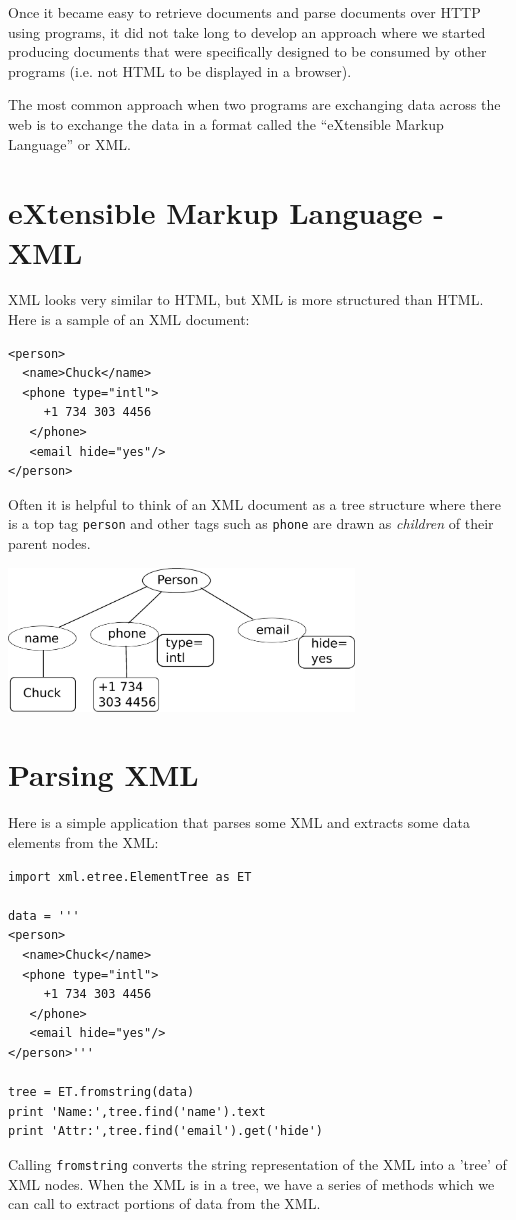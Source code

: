 \documentclass[10pt]{book}
\begin{document}
Once it became easy to retrieve documents and parse documents 
over HTTP using programs, it did not take long to develop 
an approach where we started producing documents that were specifically
designed to be consumed by other 
programs (i.e. not HTML to be displayed in a browser).

The most common approach when two programs are exchanging data across 
the web is to exchange the data in a format called the ``eXtensible Markup 
Language'' or XML.  

\section{eXtensible Markup Language - XML}

XML looks very similar to HTML, but XML is more structured 
than HTML.  Here is a sample of an XML document:

\beforeverb
\begin{verbatim}
<person>
  <name>Chuck</name>
  <phone type="intl">
     +1 734 303 4456
   </phone>
   <email hide="yes"/>
</person>
\end{verbatim}
\afterverb
%
Often it is helpful to think of an XML document as a tree structure
where there is a top tag {\tt person} and other tags such as {\tt phone}
are drawn as \emph{children} of their parent nodes.

\beforefig
\centerline{\includegraphics[height=1.50in]{figs2/xml-tree.eps}}
\afterfig

\section{Parsing XML}

Here is a simple application that parses some XML
and extracts some data elements from the XML:

\beforeverb
\begin{verbatim}
import xml.etree.ElementTree as ET

data = '''
<person>
  <name>Chuck</name>
  <phone type="intl">
     +1 734 303 4456
   </phone>
   <email hide="yes"/>
</person>'''

tree = ET.fromstring(data)
print 'Name:',tree.find('name').text
print 'Attr:',tree.find('email').get('hide')
\end{verbatim}
\afterverb
%
Calling {\tt fromstring} converts the string representation
of the XML into a 'tree' of XML nodes.  When the
XML is in a tree, we have a series of methods which we can call to 
extract portions of data from the XML.  
\end{document}
